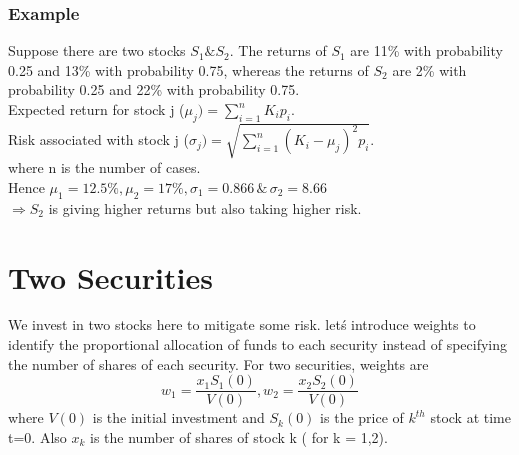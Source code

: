 \subsubsection{Example}
Suppose there are two stocks $S_{1} \& S_{2}$. The returns of $S_{1}$ are 11\% with probability 0.25 and 13\% with probability 0.75, whereas the returns of $S_{2}$ are 2\% with probability 0.25 and 22\% with probability 0.75.
\\ Expected return for stock j ($\mu_{j}) = \displaystyle \sum_{i=1}^{n} K_{i}p_{i}$.
\\ Risk associated with stock j ($\sigma_{j}) = \displaystyle \sqrt{\sum_{i=1}^{n} (K_{i}-\mu_{j})^{2}p_{i}}$.
\\where n is the number of cases.
\\Hence $\mu_{1}=12.5\%, \mu_{2}=17\%, \sigma_{1}=0.866 \,\&\,  \sigma_{2}=8.66$
\\ $\Rightarrow S_{2}$ is giving higher returns but also taking higher risk.

\section{Two Securities}
We invest in two stocks here to mitigate some risk. let\'s introduce weights to identify the proportional allocation of funds to each security instead of specifying the number of shares of each security. For two securities, weights are
$$w_{1}=\frac{x_{1}S_{1}(0)}{V(0)}, w_{2}=\frac{x_{2}S_{2}(0)}{V(0)}$$
where $V(0)$ is the initial investment and $S_{k}(0)$ is the price of $k^{th}$ stock at time t=0. Also $x_{k}$ is the number of shares of stock k ( for k = 1,2).
